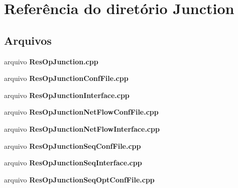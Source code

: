\section{Referência do diretório Junction}
\label{dir_9156f73191154e628d67d2234ec23cba}
\subsection*{Arquivos}
\begin{DoxyCompactItemize}
\item 
arquivo {\bf Res\+Op\+Junction.\+cpp}
\item 
arquivo {\bf Res\+Op\+Junction\+Conf\+File.\+cpp}
\item 
arquivo {\bf Res\+Op\+Junction\+Interface.\+cpp}
\item 
arquivo {\bf Res\+Op\+Junction\+Net\+Flow\+Conf\+File.\+cpp}
\item 
arquivo {\bf Res\+Op\+Junction\+Net\+Flow\+Interface.\+cpp}
\item 
arquivo {\bf Res\+Op\+Junction\+Seq\+Conf\+File.\+cpp}
\item 
arquivo {\bf Res\+Op\+Junction\+Seq\+Interface.\+cpp}
\item 
arquivo {\bf Res\+Op\+Junction\+Seq\+Opt\+Conf\+File.\+cpp}
\end{DoxyCompactItemize}
